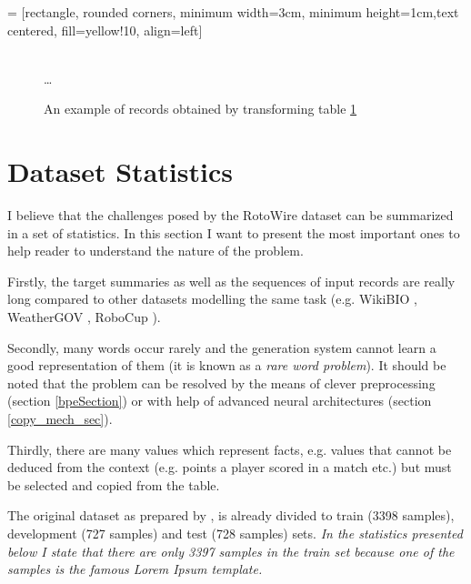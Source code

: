 = [rectangle, rounded corners, minimum width=3cm, minimum height=1cm,text centered, fill=yellow!10, align=left]

\begin{figure}[!h]
    \centering
    \usetikzlibrary{shapes.multipart}
    \\ \dots
    \caption{An example of records obtained by transforming table \ref{ex_seq_rec}} \label{ex_seq_rec}
\end{figure}

\section{Dataset Statistics} \label{assumptions_ref}

I believe that the challenges posed by the RotoWire dataset can be summarized in a set of statistics. In this section I want to present the most important ones to help reader to understand the nature of the problem. 

Firstly, the target summaries as well as the sequences of input records are really long compared to other datasets modelling the same task (e.g. WikiBIO \citep{lebret2016neural}, WeatherGOV \citep{liang-etal-2009-learning}, RoboCup \citep{chen2008robocup}).

Secondly, many words occur rarely and the generation system cannot learn a good representation of them (it is known as a \emph{rare word problem}). It should be noted that the problem can be resolved by the means of clever preprocessing (section \ref{bpeSection}) or with help of advanced neural architectures (section \ref{copy_mech_sec}).

Thirdly, there are many values which represent facts, e.g. values that cannot be deduced from the context (e.g. points a player scored in a match etc.) but must be selected and copied from the table.

The original dataset as prepared by \citep{wiseman2017}, is already divided to train (3398 samples), development (727 samples) and test (728 samples) sets. \emph{In the statistics presented below I state that there are only 3397 samples in the train set because one of the samples is the famous Lorem Ipsum template.}

